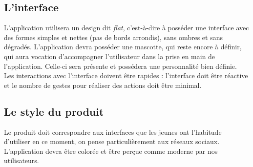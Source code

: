 \subsection{L'interface}
L'application utilisera un design dit \textit{flat}, c'est-à-dire à posséder une interface avec des formes simples et nettes (pas de bords arrondis), sans ombres et sans dégradés. L'application devra posséder une mascotte, qui reste encore à définir, qui aura vocation d'accompagner l'utilisateur dans la prise en main de l'application. Celle-ci sera présente et possédera une personnalité bien définie.\\

Les interactions avec l'interface doivent être rapides : l'interface doit être réactive et le nombre de gestes pour réaliser des actions doit être minimal.

\subsection{Le style du produit}
Le produit doit correspondre aux interfaces que les jeunes ont l'habitude d'utiliser en ce moment, on pense particulièrement aux réseaux sociaux. L'application devra être colorée et être perçue comme moderne par nos utilisateurs.